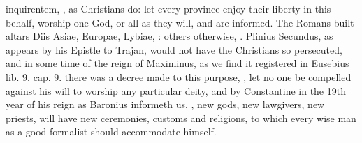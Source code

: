 {{inquirentem}, \etc{}, as Christians do: let every province enjoy their
liberty in this behalf, worship one God, or all as they will, and are
informed. The Romans built altars Diis Asiae, Europae, Lybiae, : others otherwise, \etc{}. Plinius Secundus, as
appears by his Epistle to Trajan, would not have the Christians so
persecuted, and in some time of the reign of Maximinus, as we find it
registered in Eusebius \textlatin{lib. 9. cap. 9.} there was a decree made to this
purpose, , let no
one be compelled against his will to worship any particular deity, and
by Constantine in the 19th year of his reign as Baronius
informeth us, , new gods, new lawgivers, new priests, will
have new ceremonies, customs and religions, to which every wise man as
a good formalist should accommodate himself.


}
